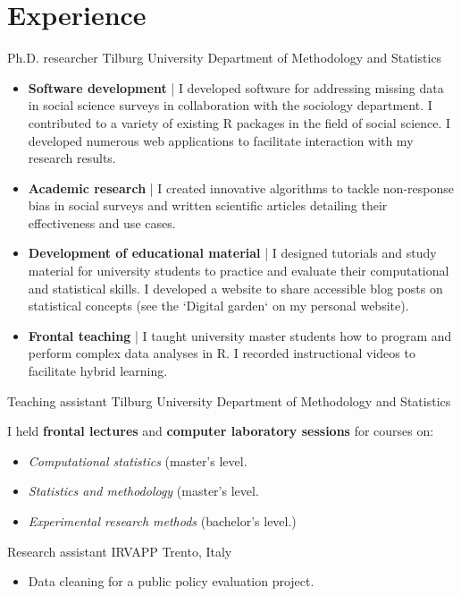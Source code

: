 \section{Experience}

{Ph.D. researcher}
{Tilburg University} %
{} %
{Department of Methodology and Statistics}   %
{
    \vspace{0.1em}
    \begin{spacing}{1.1}
    \begin{itemize}
        \item \textbf{Software development} | I developed software for addressing missing data in social science surveys in collaboration with the sociology department. I contributed to a variety of existing R packages in the field of social science. I developed numerous web applications to facilitate interaction with my research results.
        \item \textbf{Academic research} | I created innovative algorithms to tackle non-response bias in social surveys and written scientific articles detailing their effectiveness and use cases.
        \item \textbf{Development of educational material} | I designed tutorials and study material for university students to practice and evaluate their computational and statistical skills. I developed a website to share accessible blog posts on statistical concepts (see the `Digital garden` on my personal website).
        \item \textbf{Frontal teaching} | I taught university master students how to program and perform complex data analyses in R. I recorded instructional videos to facilitate hybrid learning.
    \end{itemize}
    \end{spacing}
    \vspace{1em}
}

{Teaching assistant}
{Tilburg University} %
{} %
{Department of Methodology and Statistics}   %
{
    \vspace{0.1em}
    \begin{spacing}{1.1}
    I held \textbf{frontal lectures} and \textbf{computer laboratory sessions} for courses on:
    \begin{itemize}
        \item \textit{Computational statistics} (master's level.
		\item \textit{Statistics and methodology} (master's level.
		\item \textit{Experimental research methods} (bachelor's level.)
    \end{itemize}
    \end{spacing}
    \vspace{1em}
}

{Research assistant}
{IRVAPP} %
{Trento, Italy} %
{}   %
{
    \vspace{0.1em}
    \begin{itemize}
        \item Data cleaning for a public policy evaluation project.
    \end{itemize}
}

